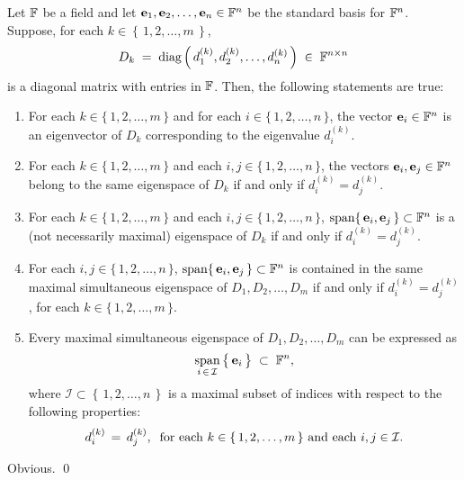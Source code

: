 \begin{lemma}
\label{simultaneousESpace}
\mbox{}\vskip 0.05cm
\noindent
Let $\mathbb{F}$ be a field and
let $\mathbf{e}_{1}, \mathbf{e}_{2}, \ldots, \mathbf{e}_{n} \in \mathbb{F}^{n}$ be the standard basis for $\mathbb{F}^{n}$.
Suppose, for each $k \in \left\{\,1,2,\ldots,m\,\right\}$,
\begin{equation*}
D_{k} \; = \; \textnormal{diag}\left(\,d^{(k)}_{1},d^{(k)}_{2},\ldots,d^{(k)}_{n}\,\right) \;\in\; \mathbb{F}^{n \times n}
\end{equation*}
is a diagonal matrix with entries in $\mathbb{F}$.
Then, the following statements are true:
\begin{enumerate}
\item
	For each $k \in\{\,1, 2, \ldots, m\,\}$ and for each $i \in \{\,1,2,\ldots,n\,\}$,
	the vector $\mathbf{e}_{i} \in \mathbb{F}^{n}$ is an eigenvector of $D_{k}$
	corresponding to the eigenvalue $d^{(k)}_{i}$.
\item
	For each $k \in\{\,1, 2, \ldots, m\,\}$ and each $i,j \in \{\,1,2,\ldots,n\,\}$,
	the vectors $\mathbf{e}_{i}, \mathbf{e}_{j} \in \mathbb{F}^{n}$ belong to the same eigenspace
	of $D_{k}$ if and only if $d^{(k)}_{i} = d^{(k)}_{j}$.
\item
	For each $k \in\{\,1, 2, \ldots, m\,\}$ and each $i,j \in \{\,1,2,\ldots,n\,\}$,
	$\textnormal{span}\!\left\{\,\mathbf{e}_{i}, \mathbf{e}_{j}\,\right\} \subset \mathbb{F}^{n}$
	is a (not necessarily maximal) eigenspace of $D_{k}$ if and only if $d^{(k)}_{i} = d^{(k)}_{j}$.
\item
	For each $i,j \in \{\,1,2,\ldots,n\,\}$, 
	$\textnormal{span}\!\left\{\,\mathbf{e}_{i}, \mathbf{e}_{j}\,\right\} \subset \mathbb{F}^{n}$
	is contained in the same maximal simultaneous eigenspace of
	$D_{1}, D_{2}, \ldots, D_{m}$
	if and only if $d^{(k)}_{i} = d^{(k)}_{j}$, for each $k \in \{\,1,2,\ldots,m\,\}$.
\item
	Every maximal simultaneous eigenspace of $D_{1}, D_{2}, \ldots, D_{m}$
	can be expressed as
	\begin{equation*}
	\underset{i\,\in\,\mathcal{I}}{\span}\left\{\,\overset{{\color{white}.}}{\mathbf{e}}_{i}\,\right\}
	\;\subset\;\F^{n},
	\end{equation*}
	where $\mathcal{I} \subset \left\{\,1,2,\ldots,n\,\right\}$ is a maximal subset of indices
	with respect to the following properties:
	\begin{equation*}
	d^{(k)}_{i} \,=\, d^{(k)}_{j},
	\;\;
	\textnormal{for each $k \in \left\{\,1,2,\ldots,m\,\right\}$ and each $i,j \in \mathcal{I}$}.
	\end{equation*}
\end{enumerate}
\end{lemma}
\proof Obvious. \qed

